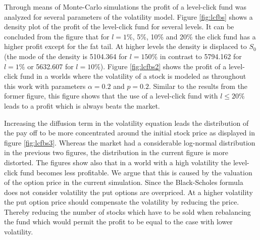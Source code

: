 \documentclass[a4paper,onecolumn]{IEEEtran}
\begin{document}
Through means of Monte-Carlo simulations the profit of a level-click fund was
analyzed for several parameters of the volatility model. Figure
\ref{fig:lcfbs} shows a density plot of the profit of the level-click fund for
several levels. It can be concluded from the figure that for $l = 1\%$, 5\%,
10\% and 20\% the click fund has a higher profit except for the fat tail. At
higher levels the density is displaced to $S_0$ (the mode of the density is
5104.364 for $l= 150\%$ in contrast to 5794.162 for $l=1\%$ or 5632.607 for
$l=10\%$). Figure \ref{fig:lcfbs2} shows the profit of a level-click fund in a
worlds where the volatility of a stock is modeled as throughout this work with
parameters $\alpha = 0.2$ and $p=0.2$. Similar to the results from the former
figure, this figure shows that the use of a level-click fund with $l \leq
20\%$ leads to a profit which is always beats the market.

Increasing the diffusion term in the volatility equation leads the
distribution of the pay off to be more concentrated around the initial stock
price as displayed in figure \ref{fig:lcfbs3}. Whereas the market had a
considerable log-normal distribution in the previous two figures, the
distribution in the current figure is more distorted. The figures show also
that in a world with a high volatility the level-click fund becomes less
profitable. We argue that this is caused by the valuation of the option price
in the current simulation. Since the Black-Scholes formula does not consider
volatility the put options are overpriced. At a higher volatility the put
option price should compensate the volatility by reducing the price. Thereby
reducing the number of stocks which have to be sold when rebalancing the fund
which would permit the profit to be equal to the case with lower volatility.



\end{document}
